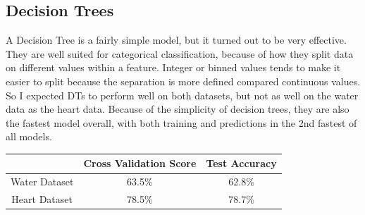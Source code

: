 \documentclass[
	letterpaper, %
]{mlreport}
\begin{document}
\subsection{Decision Trees}
A Decision Tree is a fairly simple model, but it turned out to be very effective. They are well suited for categorical classification, because of how they split data on different values within a feature. Integer or binned values tends to make it easier to split because the separation is more defined compared continuous values. So I expected DTs to perform well on both datasets, but not as well on the water data as the heart data. Because of the simplicity of decision trees, they are also the fastest model overall, with both training and predictions in the 2nd fastest of all models.
\begin{center}
	\begin{tabular}{|c||c|c|}
	 \hline
	  & Cross Validation Score & Test Accuracy \\
	 \hline\hline
	 Water Dataset & 63.5\%  & 62.8\% \\
	 \hline
	 Heart Dataset & 78.5\%  & 78.7\% \\
	 \hline
	\end{tabular}
	\label{table:table1}
\end{center}
\end{document}
